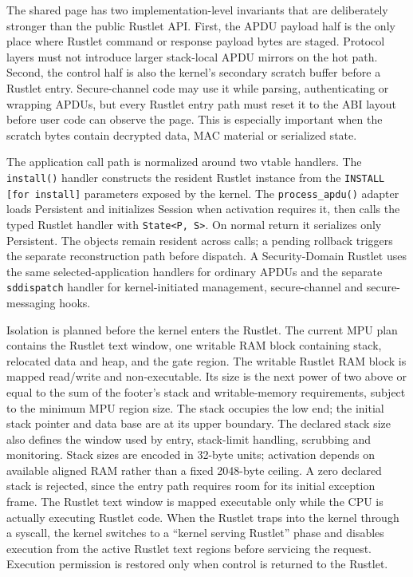 The shared page has two implementation-level invariants that are deliberately
stronger than the public Rustlet API. First, the APDU payload half is the only
place where Rustlet command or response payload bytes are staged. Protocol
layers must not introduce larger stack-local APDU mirrors on the hot path.
Second, the control half is also the kernel's secondary scratch buffer before a
Rustlet entry. Secure-channel code may use it while parsing, authenticating or
wrapping APDUs, but every Rustlet entry path must reset it to the ABI layout
before user code can observe the page. This is especially important when the
scratch bytes contain decrypted data, MAC material or serialized state.

The application call path is normalized around two vtable handlers. The
\texttt{install()} handler constructs the resident Rustlet instance from the
\texttt{INSTALL [for install]} parameters exposed by the kernel. The
\texttt{process\_apdu()} adapter loads Persistent and initializes
Session when activation requires it, then calls the typed Rustlet handler
with \texttt{State<P, S>}. On normal return it serializes only Persistent.
The objects remain resident across calls; a pending rollback triggers the
separate reconstruction path before dispatch. A Security-Domain Rustlet uses the same selected-application
handlers for ordinary APDUs and the separate \texttt{sddispatch} handler for
kernel-initiated management, secure-channel and secure-messaging hooks.

Isolation is planned before the kernel enters the Rustlet. The current MPU plan
contains the Rustlet text window, one writable RAM block containing stack,
relocated data and heap, and the gate region. The writable Rustlet RAM block is
mapped read/write and non-executable. Its size is the next power of two above
or equal to the sum of the footer's stack and writable-memory requirements,
subject to the minimum MPU region size.
The stack occupies the low end; the initial stack pointer and data base are at
its upper boundary. The declared stack size also defines the window used by
entry, stack-limit handling, scrubbing and monitoring. Stack sizes are
encoded in 32-byte units; activation depends on available aligned RAM rather
than a fixed 2048-byte ceiling. A zero declared stack is rejected, since the
entry path requires room for its initial exception frame.
The Rustlet text window is mapped executable only
while the CPU is actually executing Rustlet code. When the Rustlet traps into
the kernel through a syscall, the kernel switches to a
``kernel serving Rustlet'' phase and disables execution from the active Rustlet
text regions before servicing the request. Execution permission is restored
only when control is returned to the Rustlet.

